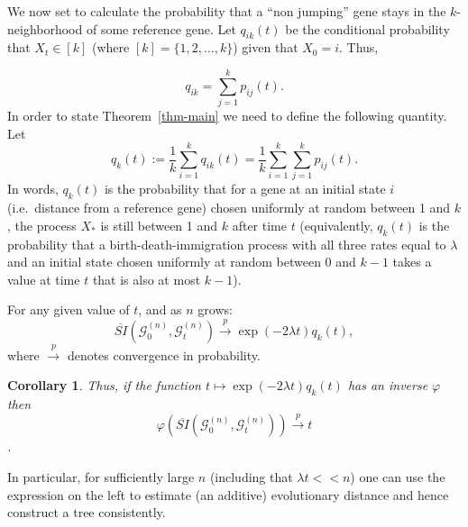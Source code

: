\documentclass[runningheads, 11pt]{llncs}
\newtheorem{cor}[thm]{Corollary}
\newcommand{\G}{\mathcal{G}^{(n)}}
\begin{document}
We now set to calculate the probability that a ``non jumping'' gene stays in the
$k$-neighborhood of some reference gene.
Let $q_{ik}(t)$ be the conditional probability that $X_t \in [k]$ (where
$[k]=\{1,2,\ldots, k\}$) given that $X_0=i$. Thus,

\begin{equation}
 \label{eqy0}
 q_{ik} = \sum_{j=1}^k p_{ij}(t).
\end{equation}
In order to state Theorem~\ref{thm-main} we need to define the following
quantity. Let 
\begin{equation}
 \label{eqy}
 q_k(t) := \frac{1}{k}\sum_{i=1}^k q_{ik}(t) =
 \frac{1}{k}\sum_{i=1}^k\sum_{j=1}^k p_{ij}(t).
\end{equation}
In words, $q_k(t)$ is the probability that for {a gene at } an initial state $i$
{(i.e.\ distance from a reference gene)} chosen uniformly at random between 1 and
$k$, the process $X_*$ is still between 1 and $k$ after time $t$ (equivalently,
$q_k(t)$ is the probability that a birth-death-immigration process with all
three rates equal to $\lambda$ and an initial state chosen uniformly at random
between 0 and $k-1$ takes a value at time $t$ that is also at most $k-1$). 

\begin{theorem}
\label{thm-main}
For any given value of $t$, and as $n$ {grows}: $$\overline{SI}(\G_0, \G_t)
\xrightarrow{p} \exp(-2\lambda t)q_k(t),$$ where $\xrightarrow{p}$ denotes
convergence in probability. 
\end{theorem}

\begin{cor}
Thus, if the function $t \mapsto \exp(-2\lambda t)q_k(t)$ has an inverse
$\varphi$ then $$\varphi( \overline{SI}(\G_0, \G_t)) \xrightarrow{p} t$$.
\end{cor}
In particular, for sufficiently large $n$ (including that $\lambda t << n$) one
can use the expression on the left to estimate (an additive) evolutionary
distance and hence construct a tree consistently.

\bigskip
\end{document}
